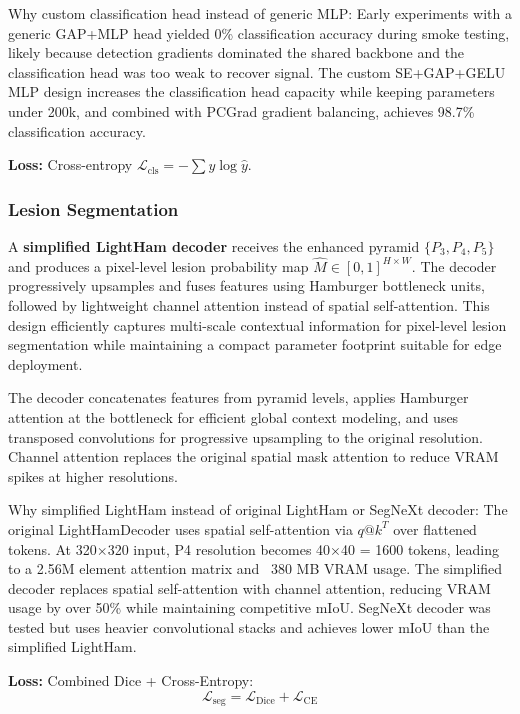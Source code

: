 \documentclass[10pt,a4paper,twocolumn]{article}
\begin{document}
Why custom classification head instead of generic MLP: Early experiments with a generic GAP+MLP head yielded 0\% classification accuracy during smoke testing, likely because detection gradients dominated the shared backbone and the classification head was too weak to recover signal. The custom SE+GAP+GELU MLP design increases the classification head capacity while keeping parameters under 200k, and combined with PCGrad gradient balancing, achieves 98.7\% classification accuracy.

\textbf{Loss:} Cross-entropy $\mathcal{L}_{\text{cls}} = -\sum y \log \hat{y}$.

\subsubsection{Lesion Segmentation}

A \textbf{simplified LightHam decoder} receives the enhanced pyramid $\{P_3, P_4, P_5\}$ and produces a pixel-level lesion probability map $\hat{M} \in [0,1]^{H \times W}$. The decoder progressively upsamples and fuses features using Hamburger bottleneck units, followed by lightweight channel attention instead of spatial self-attention. This design efficiently captures multi-scale contextual information for pixel-level lesion segmentation while maintaining a compact parameter footprint suitable for edge deployment.

The decoder concatenates features from pyramid levels, applies Hamburger attention at the bottleneck for efficient global context modeling, and uses transposed convolutions for progressive upsampling to the original resolution. Channel attention replaces the original spatial mask attention to reduce VRAM spikes at higher resolutions.

Why simplified LightHam instead of original LightHam or SegNeXt decoder: The original LightHamDecoder uses spatial self-attention via $q @ k^T$ over flattened tokens. At 320$\times$320 input, P4 resolution becomes 40$\times$40 = 1600 tokens, leading to a 2.56M element attention matrix and ~380 MB VRAM usage. The simplified decoder replaces spatial self-attention with channel attention, reducing VRAM usage by over 50\% while maintaining competitive mIoU. SegNeXt decoder was tested but uses heavier convolutional stacks and achieves lower mIoU than the simplified LightHam.

\textbf{Loss:} Combined Dice + Cross-Entropy:
\begin{equation}
\mathcal{L}_{\text{seg}} = \mathcal{L}_{\text{Dice}} + \mathcal{L}_{\text{CE}}
\end{equation}
\end{document}

